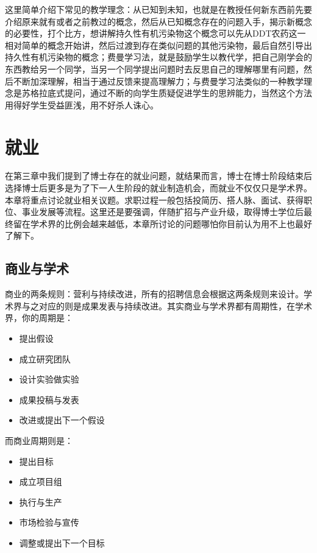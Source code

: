 \documentclass[]{tufte-book}
\providecommand{\tightlist}{%
  \setlength{\itemsep}{0pt}\setlength{\parskip}{0pt}}
\begin{document}
这里简单介绍下常见的教学理念：从已知到未知，也就是在教授任何新东西前先要介绍原来就有或者之前教过的概念，然后从已知概念存在的问题入手，揭示新概念的必要性，打个比方，想讲解持久性有机污染物这个概念可以先从DDT农药这一相对简单的概念开始讲，然后过渡到存在类似问题的其他污染物，最后自然引导出持久性有机污染物的概念；费曼学习法，就是鼓励学生以教代学，把自己刚学会的东西教给另一个同学，当另一个同学提出问题时去反思自己的理解哪里有问题，然后不断加深理解，相当于通过反馈来提高理解力；与费曼学习法类似的一种教学理念是苏格拉底式提问，通过不断的向学生质疑促进学生的思辨能力，当然这个方法用得好学生受益匪浅，用不好杀人诛心。

\hypertarget{career}{%
\chapter{就业}\label{career}}

在第三章中我们提到了博士存在的就业问题，就结果而言，博士在博士阶段结束后选择博士后更多是为了下一人生阶段的就业制造机会，而就业不仅仅只是学术界。本章将重点讨论就业相关议题。求职过程一般包括投简历、搭人脉、面试、获得职位、事业发展等流程。这里还是要强调，伴随扩招与产业升级，取得博士学位后最终留在学术界的比例会越来越低，本章所讨论的问题哪怕你目前认为用不上也最好了解下。

\hypertarget{ux5546ux4e1aux4e0eux5b66ux672f}{%
\section{商业与学术}\label{ux5546ux4e1aux4e0eux5b66ux672f}}

商业的两条规则：营利与持续改进，所有的招聘信息会根据这两条规则来设计。学术界与之对应的则是成果发表与持续改进。其实商业与学术界都有周期性，在学术界，你的周期是：

\begin{itemize}
\tightlist
\item
  提出假设
\item
  成立研究团队
\item
  设计实验做实验
\item
  成果投稿与发表
\item
  改进或提出下一个假设
\end{itemize}

而商业周期则是：

\begin{itemize}
\tightlist
\item
  提出目标
\item
  成立项目组
\item
  执行与生产
\item
  市场检验与宣传
\item
  调整或提出下一个目标
\end{itemize}
\end{document}
